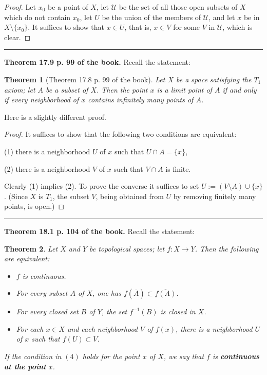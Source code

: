 \documentclass[12pt,letterpaper]{article}
\newtheorem{thm}{Theorem}%
\newcommand{\mc}{\mathcal}
\newcommand{\noi}{\noindent}%
\newcommand{\sm}{\setminus}
\begin{document}
\begin{proof}
Let $x_0$ be a point of $X$, let $\mc U$ be the set of all those open subsets of $X$ which do not contain $x_0$, let $U$ be the union of the members of $\mc U$, and let $x$ be in $X\sm\{x_0\}$. It suffices to show that $x\in U$, that is, $x\in V$ for some $V$ in $\mc U$, which is clear. 
\end{proof} 

\hrule\medskip

\noi\textbf{Theorem 17.9 p. 99 of the book.} Recall the statement: 

\begin{thm}[Theorem 17.8 p. 99 of the book]%
Let $X$ be a space satisfying the $T_1$ axiom; let $A$ be a subset of $X$. Then the point $x$ is a limit point of $A$ if and only if every neighborhood of $x$ contains infinitely many points of $A$.
\end{thm} 

Here is a slightly different proof. 

\begin{proof}
It suffices to show that the following two conditions are equivalent: 

(1) there is a neighborhood $U$ of $x$ such that $U\cap A=\{x\}$, 

(2) there is a neighborhood $V$ of $x$ such that $V\cap A$ is finite. 

\noi Clearly (1) implies (2). To prove the converse it suffices to set $U:=(V\sm A)\cup\{x\}$. (Since $X$ is $T_1$, the subset $V$, being obtained from $U$ by removing finitely many points, is open.) 
\end{proof} 

\hrule\medskip

\noi\textbf{Theorem 18.1 p. 104 of the book.} Recall the statement:

\begin{thm}
Let $X$ and $Y$ be topological spaces; let $f: X \to Y$. Then the following are equivalent:
\begin{itemize}
    \item[$(1)$] $f$ is continuous.
    \item[$(2)$] For every subset $A$ of $X$, one has $f(\overline{A}) \subset \overline{f(A)}$.
    \item[$(3)$] For every closed set $B$ of $Y$, the set $f^{-1}(B)$ is closed in $X$.
    \item[$(4)$] For each $x \in X$ and each neighborhood $V$ of $f(x)$, there is a neighborhood $U$ of $x$ such that $f(U) \subset V$.
\end{itemize}
If the condition in $(4)$ holds for the point $x$ of $X$, we say that $f$ is \textbf{continuous at the point} $x$.
\end{thm} %
\end{document}
